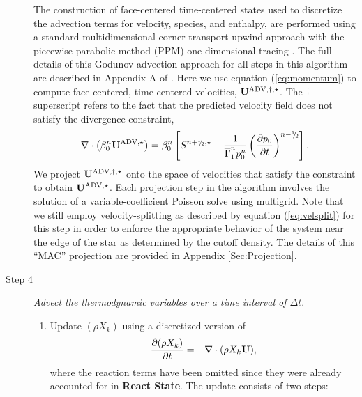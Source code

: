 \documentclass{aastex62}
\newcommand{\sfrac}[2]{\mathchoice
  {\kern0em\raise.5ex\hbox{\the\scriptfont0 #1}\kern-.15em/
   \kern-.15em\lower.25ex\hbox{\the\scriptfont0 #2}}
  {\kern0em\raise.5ex\hbox{\the\scriptfont0 #1}\kern-.15em/
   \kern-.15em\lower.25ex\hbox{\the\scriptfont0 #2}}
  {\kern0em\raise.5ex\hbox{\the\scriptscriptfont0 #1}\kern-.2em/
   \kern-.15em\lower.25ex\hbox{\the\scriptscriptfont0 #2}}
  {#1\!/#2}}
\newcommand{\myhalf}{\sfrac{1}{2}}
\newcommand{\Ub}{{\bf{U}}}
\newcommand{\dt}{\Delta t}
\newcommand{\gammaonebar}{\overline{\Gamma}_1}
\newcommand{\nph}{{n+\myhalf}}
\newcommand{\uadvone}{\Ub^{\mathrm{ADV},\star}}
\newcommand{\uadvonedag}{\Ub^{\mathrm{ADV},\dagger,\star}}
\begin{document}
\begin{description}
The construction of face-centered time-centered states used to discretize the
advection terms for velocity, species, and enthalpy, are performed using
a standard multidimensional corner transport upwind approach
\citep{colella1990multidimensional,saltzman1994unsplit} with the piecewise-parabolic method (PPM)
one-dimensional tracing \citep{colella1984piecewise}.  The full details of this
Godunov advection approach for all steps in this algorithm are described 
in Appendix A of \cite{XRB_III}.
Here we use equation (\ref{eq:momentum}) to compute face-centered, time-centered velocities, $\uadvonedag$.
The $\dagger$ superscript refers to the fact that the predicted velocity field does not satisfy the divergence constraint,
\begin{equation}
\nabla \cdot \left(\beta_0^n \uadvone\right) = \beta_0^n \left[S^{\nph,\star} - \frac{1}{\gammaonebar^np_0^n}\left(\frac{\partial p_0}{\partial t}\right)^{n-\myhalf} \right].\label{eq:div1}
\end{equation}
 We project $\uadvonedag$ onto the space of velocities that satisfy the constraint to obtain $\uadvone$.
Each projection step in the algorithm involves the solution of a variable-coefficient Poisson solve using multigrid.
Note that we still employ velocity-splitting as described by equation (\ref{eq:velsplit}) for this step 
in order to enforce the appropriate behavior of the system near the edge of the star as determined by the cutoff density.
The details of this ``MAC'' projection are provided in Appendix \ref{Sec:Projection}.

\item[Step 4] {\em Advect the thermodynamic variables over a time interval of $\dt.$}

\begin{enumerate}
\renewcommand{\theenumi}{{\bf \Alph{enumi}}}

\item Update $(\rho X_k)$ using a discretized version of
%
\begin{equation}
\frac{\partial(\rho X_k)}{\partial t} = -\nabla\cdot(\rho X_k\Ub),
\end{equation}
%
where the reaction terms have been omitted since they were already 
accounted for in {\bf React State}.  The update consists of two steps:

\begin{enumerate}
\renewcommand{\labelenumii}{{\bf \roman{enumii}}.}


\end{enumerate}
\end{enumerate}
\end{description}
\end{document}
